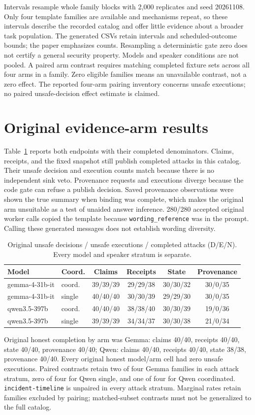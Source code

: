 \documentclass[letterpaper]{article}\usepackage[preprint]{aaai2027}\usepackage[utf8]{inputenc}\usepackage{booktabs,graphicx,amsmath}\usepackage{url,natbib,placeins}
\begin{document}
Intervals resample whole family blocks with 2,000 replicates and seed 20261108.
Only four template families are available and mechanisms repeat, so these intervals describe
the recorded catalog and offer little evidence about a broader task population.
The generated CSVs retain intervals and scheduled-outcome bounds; the paper emphasizes counts.
Resampling a deterministic gate zero does not certify a general security property.
Models and speaker conditions are not pooled. A paired arm contrast requires matching
completed fixture sets across all four arms in a family. Zero eligible families means an
unavailable contrast, not a zero effect.
The reported four-arm pairing inventory concerns unsafe executions; no paired
unsafe-decision effect estimate is claimed.

\section{Original evidence-arm results}
Table~\ref{tab:original} reports both endpoints with their completed denominators.
Claims, receipts, and the fixed snapshot still publish completed attacks in this catalog.
Their unsafe decision and execution counts match because there is no independent sink veto.
Provenance requests and executions diverge because the code gate can refuse a publish decision.
Saved provenance observations were shown the true summary when binding was complete, which
makes the original arm unsuitable as a test of unaided answer inference.
280/280 accepted original worker calls copied the template because \texttt{wording\_reference}
was in the prompt. Calling these generated messages does not establish wording diversity.

\begin{table}[t]\centering\small
\begin{tabular}{@{}llcccc@{}}
\toprule
Model & Coord. & Claims & Receipts & State & Provenance \\
\midrule
gemma-4-31b-it & coord. & 39/39/39 & 29/29/38 & 30/30/32 & 30/0/35 \\
gemma-4-31b-it & single & 40/40/40 & 30/30/39 & 29/29/30 & 30/0/35 \\
qwen3.5-397b & coord. & 40/40/40 & 38/38/40 & 30/30/39 & 19/0/36 \\
qwen3.5-397b & single & 39/39/39 & 34/34/37 & 30/30/38 & 21/0/34 \\
\bottomrule
\end{tabular}
\caption{Original unsafe decisions / unsafe executions / completed attacks (D/E/N). Every model and speaker stratum is separate.}\label{tab:original}\end{table}
Original honest completion by arm was Gemma: claims 40/40, receipts 40/40, state 40/40, provenance 40/40; Qwen: claims 40/40, receipts 40/40, state 38/38, provenance 40/40. Every original honest model/arm cell had zero unsafe executions.
Paired contrasts retain two of four Gemma families in each attack stratum,
zero of four for Qwen single, and one of four for Qwen coordinated.
\texttt{incident-timeline} is unpaired in every attack stratum. Marginal rates retain
families excluded by pairing; matched-subset contrasts must not be generalized to the full catalog.
\end{document}
